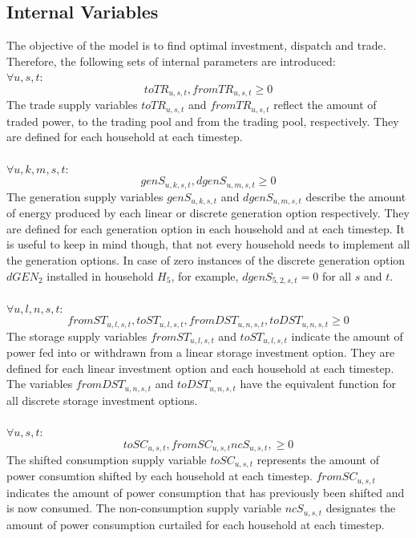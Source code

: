 \documentclass[
	11pt,								%
	DIV10,								%
	a4paper,         					%
	oneside,							%
	headheight=20pt,					%
	footheight=20pt,					%
    parskip=full,						%
    listof=totoc,						%
	bibliography=totoc,					%
	index=totoc,						%
]{scrartcl}
\begin{document}
\subsection{Internal Variables}
The objective of the model is to find optimal investment, dispatch and trade. Therefore, the following sets of internal parameters are introduced:
	\\
	$\forall u,s,t$:
	\begin{equation}
		toTR_{u,s,t}, fromTR_{u,s,t} \geq 0
	\end{equation}
	The trade supply variables $toTR_{u,s,t}$ and $fromTR_{u,s,t}$ reflect the amount of traded power, to the trading pool and from the trading pool, respectively. They are defined for each household at each timestep.
	\\\\
	$\forall u,k,m,s,t$:
	\begin{equation}
		genS_{u,k,s,t}, dgenS_{u,m,s,t} \geq 0
	\end{equation}
	The generation supply variables $genS_{u,k,s,t}$ and $dgenS_{u,m,s,t}$ describe the amount of energy produced by each linear or discrete generation option respectively. They are defined for each generation option in each household and at each timestep. It is useful to keep in mind though, that not every household needs to implement all the generation options. In case of zero instances of the discrete generation option $dGEN_2$ installed in household $H_5$, for example, $dgenS_{5,2,s,t} = 0$ for all $s$ and $t$.
	\\\\
	$\forall u,l,n,s,t$:
	\begin{equation}
	fromST_{u,l,s,t}, toST_{u,l,s,t}, fromDST_{u,n,s,t}, toDST_{u,n,s,t} \geq 0
	\end{equation}
	The storage supply variables $fromST_{u,l,s,t}$ and $toST_{u,l,s,t}$ indicate the amount of power fed into or withdrawn from a linear storage investment option. They are defined for each linear investment option and each household at each timestep. The variables $fromDST_{u,n,s,t}$ and $toDST_{u,n,s,t}$ have the equivalent function for all discrete storage investment options.	
	\\\\
	$\forall u,s,t$:
	\begin{equation}
		toSC_{u,s,t}, fromSC_{u,s,t} ncS_{u,s,t},  \geq 0
	\end{equation}
	The shifted consumption supply variable $toSC_{u,s,t}$ represents the amount of power consumtion shifted by each household at each timestep.  $fromSC_{u,s,t}$ indicates the amount of power consumption that has previously been shifted and is now consumed. The non-consumption supply variable $ncS_{u,s,t}$ designates the amount of power consumption curtailed for each household at each timestep.
\end{document}
